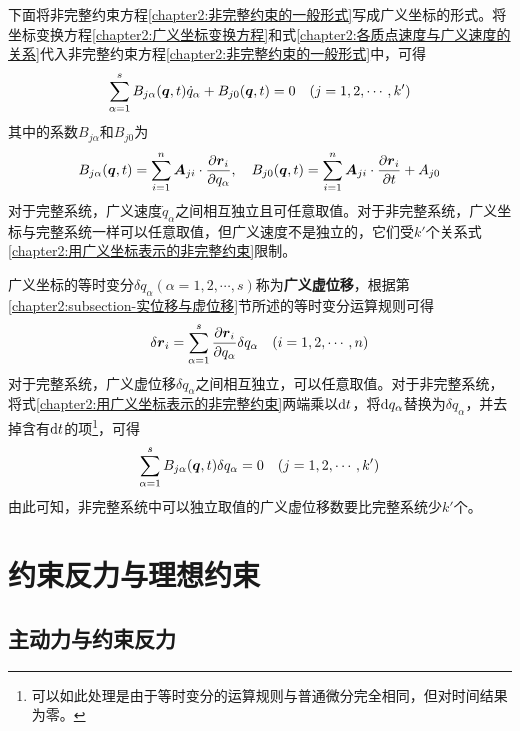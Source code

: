 下面将非完整约束方程\eqref{chapter2:非完整约束的一般形式}写成广义坐标的形式。将坐标变换方程\eqref{chapter2:广义坐标变换方程}和式\eqref{chapter2:各质点速度与广义速度的关系}代入非完整约束方程\eqref{chapter2:非完整约束的一般形式}中，可得
\begin{equation}
	\sum_{\alpha=1}^s B_{j\alpha}(\boldsymbol{q},t) \dot{q}_\alpha + B_{j0}(\boldsymbol{q},t) = 0\quad (j=1,2,\cdots,k')
	\label{chapter2:用广义坐标表示的非完整约束}
\end{equation}
其中的系数$B_{j\alpha}$和$B_{j0}$为
\begin{equation}
	B_{j\alpha}(\boldsymbol{q},t) = \sum_{i=1}^n \boldsymbol{A}_{ji}\cdot \frac{\partial \boldsymbol{r}_i}{\partial q_\alpha},\quad B_{j0}(\boldsymbol{q},t) = \sum_{i=1}^n \boldsymbol{A}_{ji}\cdot \frac{\partial \boldsymbol{r}_i}{\partial t}+A_{j0}
	\label{chapter2:用广义坐标表示的非完整约束-系数}
\end{equation}
对于完整系统，广义速度$\dot{q}_\alpha$之间相互独立且可任意取值。对于非完整系统，广义坐标与完整系统一样可以任意取值，但广义速度不是独立的，它们受$k'$个关系式\eqref{chapter2:用广义坐标表示的非完整约束}限制。

广义坐标的等时变分$\delta q_\alpha(\alpha=1,2,\cdots,s)$称为{\bf 广义虚位移}，根据第\ref{chapter2:subsection-实位移与虚位移}节所述的等时变分运算规则可得
\begin{equation}
	\delta \boldsymbol{r}_i = \sum_{\alpha=1}^s\frac{\partial \boldsymbol{r}_i}{\partial q_\alpha}\delta q_\alpha \quad (i=1,2,\cdots,n)
	\label{chapter2:虚位移与广义虚位移之间的关系}
\end{equation}
对于完整系统，广义虚位移$\delta q_\alpha$之间相互独立，可以任意取值。对于非完整系统，将式\eqref{chapter2:用广义坐标表示的非完整约束}两端乘以$\mathrm{d} t$，将$\mathrm{d} q_\alpha$替换为$\delta q_\alpha$，并去掉含有$\mathrm{d} t$的项\footnote{可以如此处理是由于等时变分的运算规则与普通微分完全相同，但对时间结果为零。}，可得
\begin{equation}
	\sum_{\alpha=1}^s B_{j\alpha}(\boldsymbol{q},t) \delta q_\alpha=0 \quad (j=1,2,\cdots,k')
	\label{chapter2:非完整约束的虚位移表示}
\end{equation}
由此可知，非完整系统中可以独立取值的广义虚位移数要比完整系统少$k'$个。

\section{约束反力与理想约束}

\subsection{主动力与约束反力}\label{chapter2:subsection-主动力与约束反力}

